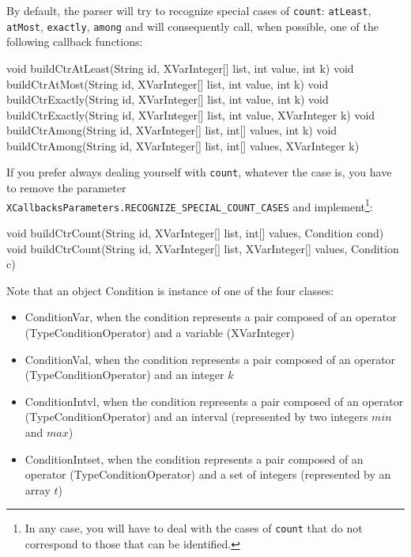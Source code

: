 \documentclass[10pt]{article}
\newenvironment{boxabsc}
               {\medskip \begin{bclogo}[barre=none,arrondi=0.2,logo=]{}\vspace{-0.6cm}}
               {\vspace{-0.1cm}\end{bclogo} \smallskip}
\newcommand{\gb}[1]{{\tt #1}} %
\begin{document}
By default, the parser will try to recognize special cases of \gb{count}: \gb{atLeast}, \gb{atMost}, \gb{exactly}, \gb{among} and will consequently call, when possible, one of the following callback functions:
\begin{boxabsc}
\begin{absc}
void buildCtrAtLeast(String id, XVarInteger[] list, int value, int k)
void buildCtrAtMost(String id, XVarInteger[] list, int value, int k)
void buildCtrExactly(String id, XVarInteger[] list, int value, int k)
void buildCtrExactly(String id, XVarInteger[] list, int value, XVarInteger k)
void buildCtrAmong(String id, XVarInteger[] list, int[] values, int k)
void buildCtrAmong(String id, XVarInteger[] list, int[] values, XVarInteger k)
\end{absc} 
\end{boxabsc}

If you prefer always dealing yourself with \gb{count}, whatever the case is, you have to remove the parameter \verb!XCallbacksParameters.RECOGNIZE_SPECIAL_COUNT_CASES! and implement\footnote{In any case, you will have to deal with the cases of \gb{count} that do not correspond to those that can be identified.}:
\begin{boxabsc}
\begin{absc}
void buildCtrCount(String id, XVarInteger[] list, int[] values, Condition cond)
void buildCtrCount(String id, XVarInteger[] list, XVarInteger[] values, Condition c)
\end{absc} 
\end{boxabsc}

Note that an object Condition is instance of one of the four classes:
\begin{itemize}
\item ConditionVar, when the condition represents a pair composed of an operator (TypeConditionOperator) and a variable (XVarInteger)
\item ConditionVal, when the condition represents a pair composed of an operator (TypeConditionOperator) and an integer $k$ 
\item ConditionIntvl, when the condition represents a pair composed of an operator (TypeConditionOperator) and an interval (represented by two integers $min$ and $max$)
\item ConditionIntset, when the condition represents a pair composed of an operator (TypeConditionOperator) and a set of integers (represented by an array $t$)
\end{itemize}
\end{document}
